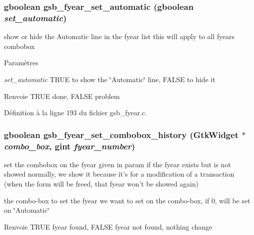\subsubsection[{gsb\_\-fyear\_\-set\_\-automatic}]{\setlength{\rightskip}{0pt plus 5cm}gboolean gsb\_\-fyear\_\-set\_\-automatic (gboolean {\em set\_\-automatic})}\label{gsb__fyear_8c_a0b7a0d85ac5432e1a72a33493fce76d7}
show or hide the Automatic line in the fyear list this will apply to all fyears combobox


\begin{DoxyParams}{Paramètres}
\item[{\em set\_\-automatic}]TRUE to show the \char`\"{}Automatic\char`\"{} line, FALSE to hide it\end{DoxyParams}
\begin{DoxyReturn}{Renvoie}
TRUE done, FALSE problem 
\end{DoxyReturn}


Définition à la ligne 193 du fichier gsb\_\-fyear.c.

\subsubsection[{gsb\_\-fyear\_\-set\_\-combobox\_\-history}]{\setlength{\rightskip}{0pt plus 5cm}gboolean gsb\_\-fyear\_\-set\_\-combobox\_\-history (GtkWidget $\ast$ {\em combo\_\-box}, \/  gint {\em fyear\_\-number})}\label{gsb__fyear_8c_aa7d81ecc027bf5ccacae5afd165b01c8}
set the combobox on the fyear given in param if the fyear exists but is not showed normally, we show it because it's for a modification of a transaction (when the form will be freed, that fyear won't be showed again)

the combo-\/box to set  the fyear we want to set on the combo-\/box, if 0, will be set on \char`\"{}Automatic\char`\"{}

\begin{DoxyReturn}{Renvoie}
TRUE fyear found, FALSE fyear not found, nothing change 
\end{DoxyReturn}


